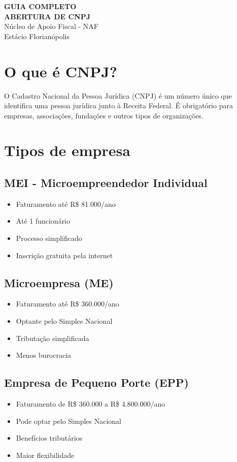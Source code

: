 \documentclass[12pt,a4paper]{article}
\begin{document}
\begin{center}
{\LARGE \textbf{GUIA COMPLETO}}\\[0.5cm]
{\Large \textbf{ABERTURA DE CNPJ}}\\[0.5cm]
{\large Núcleo de Apoio Fiscal - NAF}\\
{\large Estácio Florianópolis}\\[1cm]
\end{center}

\section{O que é CNPJ?}

O Cadastro Nacional da Pessoa Jurídica (CNPJ) é um número único que identifica uma pessoa jurídica junto à Receita Federal. É obrigatório para empresas, associações, fundações e outros tipos de organizações.

\section{Tipos de empresa}

\subsection{MEI - Microempreendedor Individual}
\begin{itemize}
    \item Faturamento até R\$ 81.000/ano
    \item Até 1 funcionário
    \item Processo simplificado
    \item Inscrição gratuita pela internet
\end{itemize}

\subsection{Microempresa (ME)}
\begin{itemize}
    \item Faturamento até R\$ 360.000/ano
    \item Optante pelo Simples Nacional
    \item Tributação simplificada
    \item Menos burocracia
\end{itemize}

\subsection{Empresa de Pequeno Porte (EPP)}
\begin{itemize}
    \item Faturamento de R\$ 360.000 a R\$ 4.800.000/ano
    \item Pode optar pelo Simples Nacional
    \item Benefícios tributários
    \item Maior flexibilidade
\end{itemize}
\end{document}
